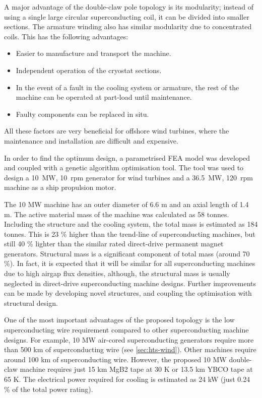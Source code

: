 \documentclass[12pt]{iopart}
\begin{document}
A major advantage of the double-claw pole topology is its modularity; instead of using a single large circular superconducting coil, it can be divided into smaller sections. The armature winding also has similar modularity due to concentrated coils. This has the following advantages:

\begin{itemize}
  \item Easier to manufacture and transport the machine.
  \item Independent operation of the cryostat sections.
  \item In the event of a fault in the cooling system or armature, the rest of the machine can be operated at part-load until maintenance.
  \item Faulty components can be replaced in situ.
\end{itemize}

All these factors are very beneficial for offshore wind turbines, where the maintenance and installation are difficult and expensive.

In order to find the optimum design, a parametrised FEA model was developed and coupled with a genetic algorithm optimisation tool. The tool was used to design a 10~MW, 10~rpm generator for wind turbines and a 36.5~MW, 120~rpm machine as a ship propulsion motor.

The 10 MW machine has an outer diameter of 6.6 m and an axial length of 1.4 m. The active material mass of the machine was calculated as 58 tonnes. Including the structure and the cooling system, the total mass is estimated as 184 tonnes. This is 23 \% higher than the trend-line of superconducting machines, but still 40 \% lighter than the similar rated direct-drive permanent magnet generators.
Structural mass is a significant component of total mass (around 70 \%). In fact, it is expected that it will be similar for all superconducting machines due to high airgap flux densities, although, the structural mass is usually neglected in direct-drive superconducting machine designs. Further improvements can be made by developing novel structures, and coupling the optimisation with structural design.

One of the most important advantages of the proposed topology is the low superconducting wire requirement compared to other superconducting machine designs. For example, 10 MW air-cored superconducting generators require more than 500 km of superconducting wire (see \ref{sec:hts-wind}). Other machines require around 100 km of superconducting wire. However, the proposed 10 MW double-claw machine requires just 15 km MgB2 tape at 30 K or 13.5 km YBCO tape at 65 K. The electrical power required for cooling is estimated as 24 kW (just 0.24 \% of the total power rating). 
\end{document}

